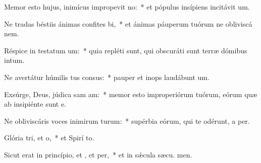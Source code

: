 \item Memor esto hujus, inimícus impropevit no:~* et pópulus insípiens incitávit  um.
\item Ne tradas béstiis ánimas confites bi,~* et ánimas páuperum tuórum ne obliviscá  nem.
\item Réspice in testatum um:~* quia repléti sunt, qui obscuráti sunt terræ dómibus intum.
\item Ne avertátur húmilis tus consus:~* pauper et inops laudábunt  um.
\item Exsúrge, Deus, júdica sam am:~* memor esto improperiórum tuórum, eórum quæ ab insipiénte sunt  e.
\item Ne obliviscáris voces inimirum turum:~* supérbia eórum, qui te odérunt, a per.
\item Glória tri, et o,~* et Spirí to.
\item Sicut erat in princípio, et , et per,~* et in sǽcula sæcu. men.
